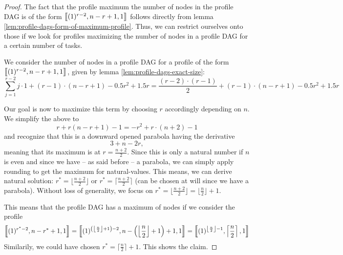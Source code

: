 \begin{proof}
  The fact that the profile maximum the number of nodes in the profile DAG is of the form $\left\llbracket (1)^{r-2},n-r+1,1 \right\rrbracket$ follows directly from lemma \ref{lem:profile-dags-form-of-maximum-profile}. Thus, we can restrict ourselves onto those if we look for profiles maximizing the number of nodes in a profile DAG for a certain number of tasks.
  
  We consider the number of nodes in a profile DAG for a profile of the form $\left\llbracket (1)^{r-2},n-r+1,1 \right\rrbracket$, given by lemma \ref{lem:profile-dags-exact-size}:
  \begin{equation*}
    \sum_{j=1}^{r-2} j \cdot 1 + (r-1)\cdot(n-r+1) -0.5r^2 +1.5r = \frac{(r-2)\cdot(r-1)}{2} + (r-1)\cdot(n-r+1) -0.5r^2 +1.5r
  \end{equation*}

  Our goal is now to maximize this term by choosing $r$ accordingly depending on $n$. We simplify the above to
  \begin{equation*}
    r+r \left( n-r+1 \right) -1 = -r^2+r\cdot(n+2)-1
  \end{equation*}
  and recognize that this is a downward opened parabola having the derivative
  \begin{equation*}
    3+n-2r,
  \end{equation*}
  meaning that its maximum is at $r=\frac{n+2}{2}$. Since this is only a natural number if $n$ is even and since we have -- as said before -- a parabola, we can simply apply rounding to get the maximum for natural-values. This means, we can derive natural solution: $r^*=\lfloor \frac{n+2}{2} \rfloor$ or $r^*=\lceil \frac{n+2}{2} \rceil$ (can be chosen at will since we have a parabola). Without loss of generality, we focus on $r^*=\lfloor \frac{n+2}{2} \rfloor = \lfloor\frac{n}{2} \rfloor + 1$.

  This means that the profile DAG has a maximum of nodes if we consider the profile
  \begin{equation*}
    \left\llbracket (1)^{r^*-2},n-r^*+1,1 \right\rrbracket = 
    \left\llbracket 
      (1)^{\left( \left\lfloor\frac{n}{2} \right\rfloor + 1 \right)-2},
      n-\left( \left\lfloor\frac{n}{2} \right\rfloor + 1 \right)+1,
      1
     \right\rrbracket = 
    \left\llbracket 
      (1)^{ \left\lfloor\frac{n}{2} \right\rfloor - 1},
      \left\lceil \frac{n}{2} \right\rceil,
      1
     \right\rrbracket 
  \end{equation*}
  Similarily, we could have chosen $r^*=\lceil\frac{n}{2}\rceil+1$. This shows the claim.
\end{proof}


